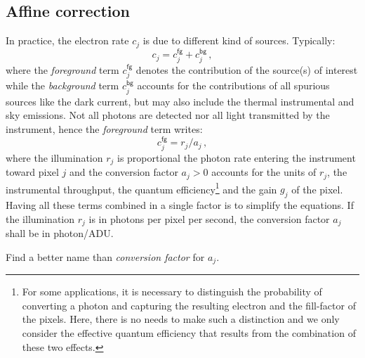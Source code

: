 \documentclass[a4paper,11pt,twoside]{scrartcl}
\newcommand{\oops}[1]{\textcolor[named]{BrickRed}{#1}}
\newcommand*{\Tag}[1]{\mathsf{#1}}
\theoremstyle{plain} %
\theoremstyle{definition}
\theoremstyle{remark}
\begin{document}
\subsection{Affine correction}
\label{sec:affine-correction}

In practice, the electron rate $c_j$ is due to different kind of sources.  Typically:
\begin{equation}
  c_j = c^\Tag{fg}_j + c^\Tag{bg}_j \,,
  \label{eq:adu-rate}
\end{equation}
where the \emph{foreground} term $c^\Tag{fg}_j$ denotes the contribution of the
source(s) of interest while the \emph{background} term $c^\Tag{bg}_j$ accounts
for the contributions of all spurious sources like the dark current, but may
also include the thermal instrumental and sky emissions. Not all photons are
detected nor all light transmitted by the instrument, hence the
\emph{foreground} term writes:
\begin{equation}
  c^\Tag{fg}_j = r_j/a_j \, ,
  \label{eq:fg-rate}
\end{equation}
where the illumination $r_j$ is proportional the photon rate entering
the instrument toward pixel $j$ and the conversion factor $a_j > 0$ accounts
for the units of $r_j$, the instrumental throughput, the quantum
efficiency\footnote{For some applications, it is necessary to distinguish the
probability of converting a photon and capturing the resulting electron and the
fill-factor of the pixels. Here, there is no needs to make such a distinction
and we only consider the effective quantum efficiency that results from the
combination of these two effects.} and the gain $g_j$ of the pixel. Having all
these terms combined in a single factor is to simplify the equations.  If the
illumination $r_j$ is in photons per pixel per second, the conversion
factor $a_j$ shall be in photon/ADU.

\oops{Find a better name than \emph{conversion factor} for $a_j$.}
\end{document}

